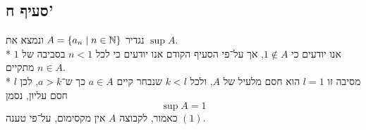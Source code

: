 \subsection{סעיף ח'}
נגדיר $A = \left\{ a_n \mid n \in \mathbb{N} \right\}$ ונמצא את $\sup A$. \\*
אנו יודעים כי $1 \notin A$, אך על־פי הסעיף הקודם אנו יודעים כי לכל $n < 1$ בסביבה של $1$ מתקיים $n \in A$. \\*
מסיבה זו $l = 1$ הוא חסם מלעיל של $A$, ולכל $k < l$ שנבחר קיים $a \in A$ כך ש־$a > k$, לכן $l$ חסם עליון, נסמן
\[
	\sup A = 1
\]
כאמור, לקבוצה $A$ אין מקסימום, על־פי טענה $(1)$.


